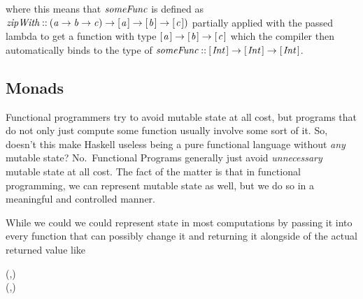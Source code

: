\documentclass[paper=A4,twoside=true,openright,parskip=full,chapterprefix=true,headings=normal,bibliography=totoc,listof=totoc,titlepage=on,captions=tableabove,draft=false,british]{scrreprt}%
\begin{document}
where this means that \ensuremath{\Varid{someFunc}} is defined as
\ensuremath{\Varid{zipWith}\mathbin{::}(\Varid{a}\to \Varid{b}\to \Varid{c})\to [\mskip1.5mu \Varid{a}\mskip1.5mu]\to [\mskip1.5mu \Varid{b}\mskip1.5mu]\to [\mskip1.5mu \Varid{c}\mskip1.5mu])} partially applied with
the passed lambda to get a function with type \ensuremath{[\mskip1.5mu \Varid{a}\mskip1.5mu]\to [\mskip1.5mu \Varid{b}\mskip1.5mu]\to [\mskip1.5mu \Varid{c}\mskip1.5mu]} which
the compiler then automatically binds to the type of
\ensuremath{\Varid{someFunc}\mathbin{::}[\mskip1.5mu \Conid{Int}\mskip1.5mu]\to [\mskip1.5mu \Conid{Int}\mskip1.5mu]\to [\mskip1.5mu \Conid{Int}\mskip1.5mu]}.

\hypertarget{monads}{%
\subsection{Monads}\label{monads}}

\label{sec:monads}

Functional programmers try to avoid mutable state at all cost, but
programs that do not only just compute some function usually involve
some sort of it. So, doesn't this make Haskell useless being a pure
functional language without \emph{any} mutable state? No.~Functional
Programs generally just avoid \emph{unnecessary} mutable state at all
cost. The fact of the matter is that in functional programming, we can
represent mutable state as well, but we do so in a meaningful and
controlled manner.

While we could we could represent state in most computations by passing
it into every function that can possibly change it and returning it
alongside of the actual returned value like


\begin{hscode}\SaveRestoreHook
{}%
%
%
\>[B]{}\mathbin{::}\to {}\to (,){}\<[E]%
\\
\>[B]{}\;\;\mathrel{=}(\mathbin{+},){}\<[E]%
\\
\>[B]{}\<[5]%
\>[5]{}\;\mathrel{=}\;\<[E]%
\ColumnHook
\end{hscode}\resethooks
\vspace{-2\baselineskip}
\end{document}
